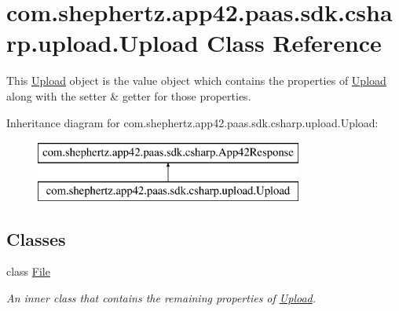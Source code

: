 \hypertarget{classcom_1_1shephertz_1_1app42_1_1paas_1_1sdk_1_1csharp_1_1upload_1_1_upload}{\section{com.\+shephertz.\+app42.\+paas.\+sdk.\+csharp.\+upload.\+Upload Class Reference}
\label{classcom_1_1shephertz_1_1app42_1_1paas_1_1sdk_1_1csharp_1_1upload_1_1_upload}
}


This \hyperlink{classcom_1_1shephertz_1_1app42_1_1paas_1_1sdk_1_1csharp_1_1upload_1_1_upload}{Upload} object is the value object which contains the properties of \hyperlink{classcom_1_1shephertz_1_1app42_1_1paas_1_1sdk_1_1csharp_1_1upload_1_1_upload}{Upload} along with the setter \& getter for those properties.  


Inheritance diagram for com.\+shephertz.\+app42.\+paas.\+sdk.\+csharp.\+upload.\+Upload\+:\begin{figure}[H]
\begin{center}
\leavevmode
\includegraphics[height=2.000000cm]{classcom_1_1shephertz_1_1app42_1_1paas_1_1sdk_1_1csharp_1_1upload_1_1_upload}
\end{center}
\end{figure}
\subsection*{Classes}
\begin{DoxyCompactItemize}
\item 
class \hyperlink{classcom_1_1shephertz_1_1app42_1_1paas_1_1sdk_1_1csharp_1_1upload_1_1_upload_1_1_file}{File}
\begin{DoxyCompactList}\small\item\em An inner class that contains the remaining properties of \hyperlink{classcom_1_1shephertz_1_1app42_1_1paas_1_1sdk_1_1csharp_1_1upload_1_1_upload}{Upload}. \end{DoxyCompactList}\end{DoxyCompactItemize}
